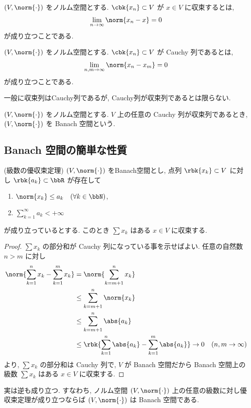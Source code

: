 \documentclass[openany, a4paper, oneside]{jsbook}
\begin{document}
\begin{defn}
 $(V, \norm{\cdot})$ をノルム空間とする.
 $\cbk{x_n} \subset V$ が $x \in V$ に収束するとは,
 \begin{align*}
  \lim_{n \to \infty} \norm{x_n - x}
  =
  0
 \end{align*}
が成り立つことである.
\end{defn}
\begin{defn}
 $(V, \norm{\cdot})$ をノルム空間とする.
 $\cbk{x_n} \subset V$ が Cauchy 列であるとは,
  \begin{align*}
   \lim_{n, m \to \infty} \norm{x_n - x_m}
   =
   0
  \end{align*}
 が成り立つことである.
\end{defn}
\begin{rem}
一般に収束列はCauchy列であるが, Cauchy列が収束列であるとは限らない.
\end{rem}
\begin{defn}
 $(V, \norm{\cdot})$ をノルム空間とする.
 $V$ 上の任意の Cauchy 列が収束列であるとき, $(V, \norm{\cdot})$ を Banach 空間という.
\end{defn}
\subsection{Banach 空間の簡単な性質}

\begin{prop}(級数の優収束定理)\label{introductory-study-function-spaces1}
 $(V, \norm{\cdot})$ をBanach空間とし, 点列 $\rbk{x_k} \subset V$ に対し $\rbk{a_k} \subset \bbR$ が存在して
\begin{enumerate}
\item $\norm{x_k} \leq a_k \quad (\forall k \in \bbN)$,
\item $\sum_{k=1}^{\infty} a_k < +\infty$
\end{enumerate}
が成り立っているとする.
このとき $\sum x_k$ はある $x \in V$ に収束する.
\end{prop}
\begin{proof}
$\sum x_k$ の部分和が Cauchy 列になっている事を示せばよい.
任意の自然数 $n > m$ に対し
\begin{align*}
 \norm{\sum_{k=1}^{n} x_k - \sum_{k=1}^{m} x_k}
 &=
 \norm{\sum_{k=m+1}^{n} x_k} \\
 &\leq
 \sum_{k=m+1}^{n} \norm{x_k} \\
 &\leq
 \sum_{k=m+1}^{n} \abs{a_k} \\
 &\leq
 \rbk{\sum_{k=1}^{n} \abs{a_k} - \sum_{k=1}^{m} \abs{a_k}} \to 0 \quad (n, m \to \infty)
\end{align*}
より, $\sum x_k$ の部分和は Cauchy 列で, $V$ が Banach 空間だから
Banach 空間上の級数 $\sum x_k$ はある $x\in V$ に収束する.
\end{proof}
\begin{rem}
実は逆も成り立つ.
すなわち, ノルム空間 $(V, \norm{\cdot})$ 上の任意の級数に対し優収束定理が成り立つならば $(V, \norm{\cdot})$ は Banach 空間である.
\end{rem}
\end{document}
